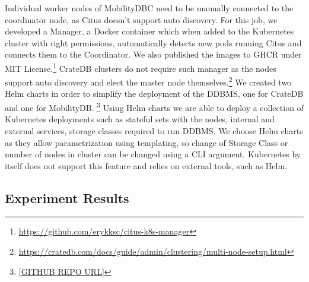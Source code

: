 Individual worker nodes of MobilityDBC need to be manually connected to the coordinator node, as Citus doesn't support auto discovery.
For this job, we developed a Manager, a Docker container which when added to the Kubernetes cluster with right permissions, automatically detects new pods running Citus and connects them to the Coordinator.
We also published the images to GHCR under MIT License.\footnote{\url{https://github.com/erykksc/citus-k8s-manager}}
CrateDB clusters do not require such manager as the nodes support auto discovery and elect the master node themselves.\footnote{\url{https://cratedb.com/docs/guide/admin/clustering/multi-node-setup.html}}
We created two Helm charts in order to simplify the deployment of the DDBMS, one for CrateDB and one for MobilityDB.
\footnote{\url{[GITHUB REPO URL]}}
Using Helm charts we are able to deploy a collection of Kubernetes deployments such as stateful sets with the nodes, internal and external services, storage classes required to run DDBMS.
We choose Helm charts as they allow parametrization using templating, so change of Storage Class or number of nodes in cluster can be changed using a CLI argument.
Kubernetes by itself does not support this feature and relies on external tools, such as Helm.

\subsection{Experiment Results}
\label{sec:experiment-results}



